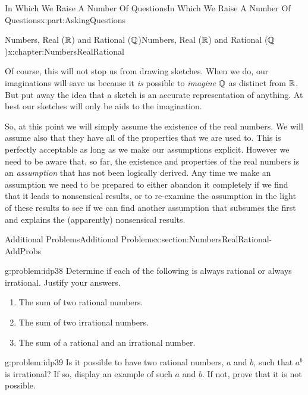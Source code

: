 \begin{partptx}{In Which We Raise A Number Of Questions}{}{In Which We Raise A Number Of Questions}{}{}{x:part:AskingQuestions}
\begin{chapterptx}{Numbers, Real (\(\mathbb {R}\)) and Rational (\(\mathbb {Q}\))}{}{Numbers, Real (\(\mathbb {R}\)) and Rational (\(\mathbb {Q}\))}{}{}{x:chapter:NumbersRealRational}
\begin{introduction}{}
			\par
			Of course, this will not stop us from drawing sketches. When we do, our imaginations will save us because it \emph{is} possible to \emph{imagine} \(\mathbb {Q}\) as distinct from \(\mathbb {R}\). But put away the idea that a sketch is an accurate representation of anything. At best our sketches will only be aids to the imagination.%
			\par
			So, at this point we will simply assume the existence of the real numbers. We will assume also that they have all of the properties that we are used to. This is perfectly acceptable as long as we make our assumptions explicit. However we need to be aware that, so far, the existence and properties of the real numbers is an \emph{assumption} that has not been logically derived. Any time we make an assumption we need to be prepared to either abandon it completely if we find that it leads to nonsensical results, or to re-examine the assumption in the light of these results to see if we can find another assumption that subsumes the first and explains the (apparently) nonsensical results.%
		\end{introduction}%
		\typeout{************************************************}
		\typeout{************************************************}
		\begin{sectionptx}{Additional Problems}{}{Additional Problems}{}{}{x:section:NumbersRealRational-AddProbs}
			\begin{problem}{}{g:problem:idp38}%
				Determine if each of the following is always rational or always irrational. Justify your answers.%
				\begin{enumerate}[font=\bfseries,label=(\alph*),ref=\alph*]
					\item{}The sum of two rational numbers.%
					\item{}The sum of two irrational numbers.%
					\item{}The sum of a rational and an irrational number.%
				\end{enumerate}
			\end{problem}
			\begin{problem}{}{g:problem:idp39}%
				 Is it possible to have two rational numbers, \(a\) and \(b\), such that \(a^b\) is irrational? If so, display an example of such \(a\) and \(b\). If not, prove that it is not possible.%

\end{problem}
\end{sectionptx}
\end{chapterptx}
\end{partptx}
